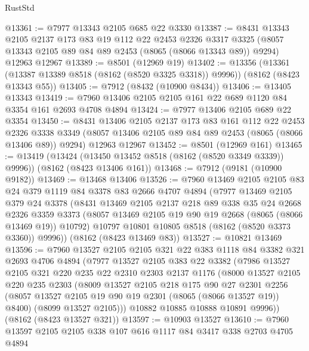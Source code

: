 \begin{lexlean}{RustStd}
\begin{coremodule}
@13361 := @7977 @13343 @2105 @685 @22 @3330
@13387 := @8431
    @13343
    @2105
    @2137
    @173
    @83
    @19
    @112
    @22
    @2453
    @2326
    @3317
    @3325
    (@8057 @13343 @2105 @89 @84 @89 @2453 (@8065 (@8066 @13343 @89)) @9294)
    @12963
    @12967
@13389 := @8501 (@12969 @19)
@13402 := @13356
    (@13361 (@13387 @13389 @8518 (@8162 (@8520 @3325 @3318)) @9996))
    (@8162 (@8423 @13343 @55))
@13405 := @7912 (@8432 (@10900 @8434))
@13406 := @13405 @13343
@13419 := @7960 @13406 @2105 @2105 @161 @22 @689 @1120 @84 @3354 @161 @2693 @4708 @4894
@13424 := @7977 @13406 @2105 @689 @22 @3354
@13450 := @8431
    @13406
    @2105
    @2137
    @173
    @83
    @161
    @112
    @22
    @2453
    @2326
    @3338
    @3349
    (@8057 @13406 @2105 @89 @84 @89 @2453 (@8065 (@8066 @13406 @89)) @9294)
    @12963
    @12967
@13452 := @8501 (@12969 @161)
@13465 := @13419
    (@13424 (@13450 @13452 @8518 (@8162 (@8520 @3349 @3339)) @9996))
    (@8162 (@8423 @13406 @161))
@13468 := @7912 (@9181 (@10900 @9182))
@13469 := @13468 @13406
@13526 := @7960
    @13469
    @2105
    @2105
    @83
    @24
    @379
    @1119
    @84
    @3378
    @83
    @2666
    @4707
    @4894
    (@7977
      @13469
      @2105
      @379
      @24
      @3378
      (@8431
        @13469
        @2105
        @2137
        @218
        @89
        @338
        @35
        @24
        @2668
        @2326
        @3359
        @3373
        (@8057 @13469 @2105 @19 @90 @19 @2668 (@8065 (@8066 @13469 @19)) @10792)
        @10797
        @10801
        @10805
        @8518
        (@8162 (@8520 @3373 @3360))
        @9996))
    (@8162 (@8423 @13469 @83))
@13527 := @10821 @13469
@13596 := @7960
    @13527
    @2105
    @2105
    @321
    @22
    @383
    @1118
    @84
    @3382
    @321
    @2693
    @4706
    @4894
    (@7977
      @13527
      @2105
      @383
      @22
      @3382
      (@7986
        @13527
        @2105
        @321
        @220
        @235
        @22
        @2310
        @2303
        @2137
        @1176
        (@8000
          @13527
          @2105
          @220
          @235
          @2303
          (@8009
            @13527
            @2105
            @218
            @175
            @90
            @27
            @2301
            @2256
            (@8057 @13527 @2105 @19 @90 @19 @2301 (@8065 (@8066 @13527 @19)) @8400)
            (@8099 @13527 @2105)))
        @10882
        @10885
        @10888
        @10891
        @9996))
    (@8162 (@8423 @13527 @321))
@13597 := @10903 @13527
@13610 := @7960 @13597 @2105 @2105 @338 @107 @616 @1117 @84 @3417 @338 @2703 @4705 @4894

\end{coremodule}
\end{lexlean}
